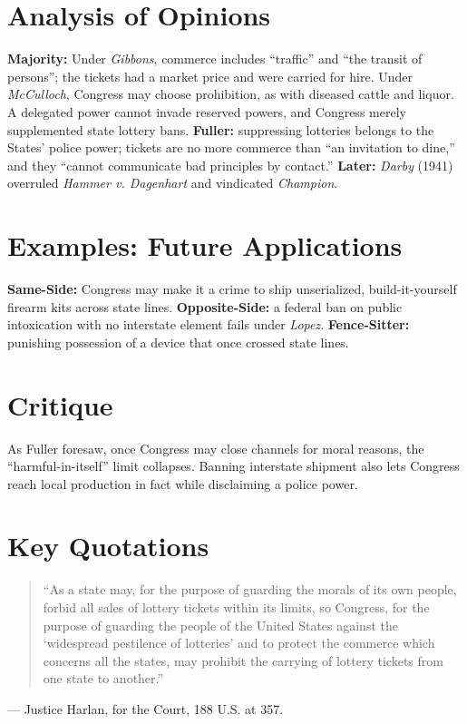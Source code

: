 \documentclass[12pt]{article}
\begin{document}
\section{Analysis of Opinions}
\textbf{Majority:} Under \textit{Gibbons}, commerce includes ``traffic'' and ``the transit of persons''; the tickets had a market price and were carried for hire. Under \textit{McCulloch}, Congress may choose prohibition, as with diseased cattle and liquor. A delegated power cannot invade reserved powers, and Congress merely supplemented state lottery bans. \textbf{Fuller:} suppressing lotteries belongs to the States' police power; tickets are no more commerce than ``an invitation to dine,'' and they ``cannot communicate bad principles by contact.'' \textbf{Later:} \textit{Darby} (1941) overruled \textit{Hammer v. Dagenhart} and vindicated \textit{Champion}.

\section{Examples: Future Applications}
\textbf{Same-Side:} Congress may make it a crime to ship unserialized, build-it-yourself firearm kits across state lines. \textbf{Opposite-Side:} a federal ban on public intoxication with no interstate element fails under \textit{Lopez}. \textbf{Fence-Sitter:} punishing possession of a device that once crossed state lines.

\section{Critique}
As Fuller foresaw, once Congress may close channels for moral reasons, the ``harmful-in-itself'' limit collapses. Banning interstate shipment also lets Congress reach local production in fact while disclaiming a police power.

\section{Key Quotations}
\begin{quote}
``As a state may, for the purpose of guarding the morals of its own people, forbid all sales of lottery tickets within its limits, so Congress, for the purpose of guarding the people of the United States against the `widespread pestilence of lotteries' and to protect the commerce which concerns all the states, may prohibit the carrying of lottery tickets from one state to another.''
\end{quote}
\noindent --- Justice Harlan, for the Court, 188 U.S. at 357.
\end{document}
